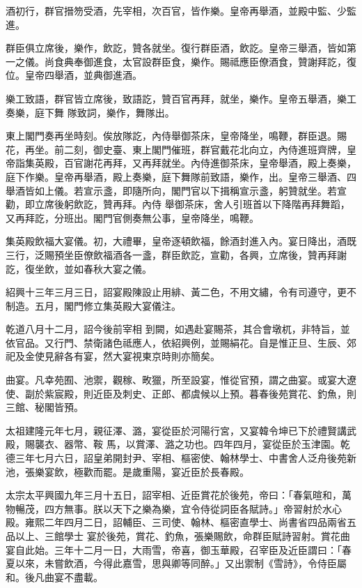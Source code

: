\begin{pinyinscope}
 酒初行，群官搢笏受酒，先宰相，次百官，皆作樂。皇帝再舉酒，並殿中監、少監進。



 群臣俱立席後，樂作，飲訖，贊各就坐。復行群臣酒，飲訖。皇帝三舉酒，皆如第一之儀。尚食典奉御進食，太官設群臣食，樂作。賜祗應臣僚酒食，贊謝拜訖，復位。皇帝四舉酒，並典御進酒。



 樂工致語，群官皆立席後，致語訖，贊百官再拜，就坐，樂作。皇帝五舉酒，樂工奏樂，庭下舞
 隊致詞，樂作，舞隊出。



 東上閣門奏再坐時刻。俟放隊訖，內侍舉御茶床，皇帝降坐，鳴鞭，群臣退。賜花，再坐。前二刻，御史臺、東上閣門催班，群官戴花北向立，內侍進班齊牌，皇帝詣集英殿，百官謝花再拜，又再拜就坐。內侍進御茶床，皇帝舉酒，殿上奏樂，庭下作樂。皇帝再舉酒，殿上奏樂，庭下舞隊前致語，樂作，出。皇帝三舉酒、四舉酒皆如上儀。若宣示盞，即隨所向，閣門官以下揖稱宣示盞，躬贊就坐。若宣勸，即立席後躬飲訖，贊再拜。內侍
 舉御茶床，舍人引班首以下降階再拜舞蹈，又再拜訖，分班出。閣門官側奏無公事，皇帝降坐，鳴鞭。



 集英殿飲福大宴儀。初，大禮畢，皇帝逐頓飲福，餘酒封進入內。宴日降出，酒既三行，泛賜預坐臣僚飲福酒各一盞，群臣飲訖，宣勸，各興，立席後，贊再拜謝訖，復坐飲，並如春秋大宴之儀。



 紹興十三年三月三日，詔宴殿陳設止用緋、黃二色，不用文繡，令有司遵守，更不制造。五月，閣門修立集英殿大宴儀注。



 乾道八月十二月，詔今後前宰相
 到闕，如遇赴宴賜茶，其合會墩杌，非特旨，並依官品。又行門、禁衛諸色祗應人，依紹興例，並賜絹花。自是惟正旦、生辰、郊祀及金使見辭各有宴，然大宴視東京時則亦簡矣。



 曲宴。凡幸苑囿、池禦，觀稼、畋獵，所至設宴，惟從官預，謂之曲宴。或宴大遼使、副於紫宸殿，則近臣及刺史、正郎、都虞候以上預。暮春後苑賞花、釣魚，則三館、秘閣皆預。



 太祖建隆元年七月，親征澤、潞，宴從臣於河陽行宮，又宴韓令坤已下於禮賢講武殿，賜襲衣、器幣、鞍
 馬，以賞澤、潞之功也。四年四月，宴從臣於玉津園。乾德三年七月六日，詔皇弟開封尹、宰相、樞密使、翰林學士、中書舍人泛舟後苑新池，張樂宴飲，極歡而罷。是歲重陽，宴近臣於長春殿。



 太宗太平興國九年三月十五日，詔宰相、近臣賞花於後苑，帝曰：「春氣暄和，萬物暢茂，四方無事。朕以天下之樂為樂，宜令侍從詞臣各賦詩。」帝習射於水心殿。雍熙二年四月二日，詔輔臣、三司使、翰林、樞密直學士、尚書省四品兩省五品以上、三館學士
 宴於後苑，賞花、釣魚，張樂賜飲，命群臣賦詩習射。賞花曲宴自此始。三年十二月一日，大雨雪，帝喜，御玉華殿，召宰臣及近臣謂曰：「春夏以來，未嘗飲酒，今得此嘉雪，思與卿等同醉。」又出禦制《雪詩》，令侍臣屬和。後凡曲宴不盡載。




\end{pinyinscope}

